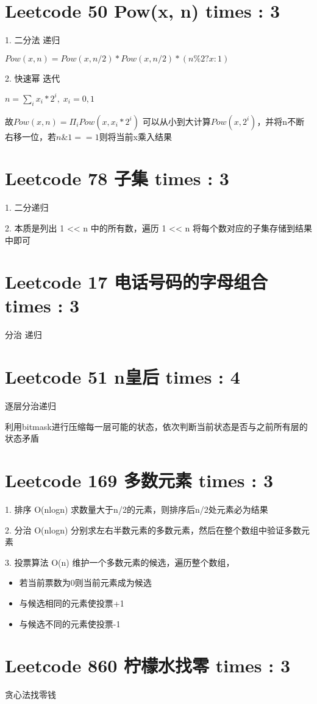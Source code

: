 \documentclass[UTF8]{ctexart}
\begin{document}
\section{Leetcode 50 Pow(x, n) times : 3}
1. 二分法   递归

$Pow(x, n) = Pow(x, n/2) * Pow(x, n/2) * (n \% 2 ? x : 1)$

2. 快速幂   迭代

$n = \sum_i x_i * 2^i, \; x_i = 0, 1$

故$Pow(x, n) = \Pi_i Pow(x, x_i * 2^i)$
可以从小到大计算$Pow(x, 2^i)$，并将n不断右移一位，若$n \& 1 == 1$则将当前x乘入结果

\section{Leetcode 78 子集 times : 3}
1. 二分递归

2. 本质是列出 1 << n 中的所有数，遍历 1 << n 将每个数对应的子集存储到结果中即可

\section{Leetcode 17 电话号码的字母组合 times : 3}
分治 递归

\section{Leetcode 51 n皇后 times : 4}
逐层分治递归

利用bitmask进行压缩每一层可能的状态，依次判断当前状态是否与之前所有层的状态矛盾

\section{Leetcode 169 多数元素 times : 3}
1. 排序 O(nlogn)
求数量大于n/2的元素，则排序后n/2处元素必为结果

2. 分治 O(nlogn)
分别求左右半数元素的多数元素，然后在整个数组中验证多数元素

3. 投票算法 O(n)
维护一个多数元素的候选，遍历整个数组，
\begin{itemize}
	\item 若当前票数为0则当前元素成为候选
	\item 与候选相同的元素使投票+1
	\item 与候选不同的元素使投票-1
\end{itemize}

\section{Leetcode 860 柠檬水找零 times : 3}
贪心法找零钱
\end{document}
